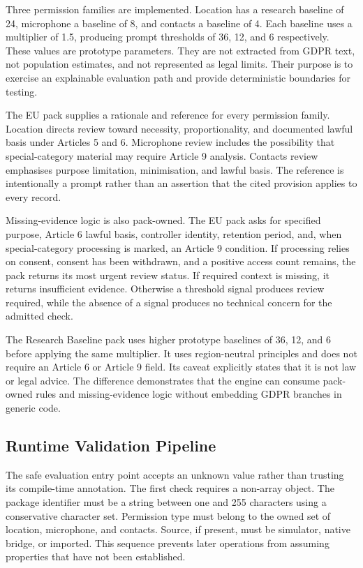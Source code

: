 Three permission families are implemented. Location has a research baseline of 24, microphone a baseline of 8, and contacts a baseline of 4. Each baseline uses a multiplier of 1.5, producing prompt thresholds of 36, 12, and 6 respectively. These values are prototype parameters. They are not extracted from GDPR text, not population estimates, and not represented as legal limits. Their purpose is to exercise an explainable evaluation path and provide deterministic boundaries for testing.

The EU pack supplies a rationale and reference for every permission family. Location directs review toward necessity, proportionality, and documented lawful basis under Articles 5 and 6. Microphone review includes the possibility that special-category material may require Article 9 analysis. Contacts review emphasises purpose limitation, minimisation, and lawful basis. The reference is intentionally a prompt rather than an assertion that the cited provision applies to every record.

Missing-evidence logic is also pack-owned. The EU pack asks for specified purpose, Article 6 lawful basis, controller identity, retention period, and, when special-category processing is marked, an Article 9 condition. If processing relies on consent, consent has been withdrawn, and a positive access count remains, the pack returns its most urgent review status. If required context is missing, it returns insufficient evidence. Otherwise a threshold signal produces review required, while the absence of a signal produces no technical concern for the admitted check.

The Research Baseline pack uses higher prototype baselines of 36, 12, and 6 before applying the same multiplier. It uses region-neutral principles and does not require an Article 6 or Article 9 field. Its caveat explicitly states that it is not law or legal advice. The difference demonstrates that the engine can consume pack-owned rules and missing-evidence logic without embedding GDPR branches in generic code.

\subsection{Runtime Validation Pipeline}

The safe evaluation entry point accepts an unknown value rather than trusting its compile-time annotation. The first check requires a non-array object. The package identifier must be a string between one and 255 characters using a conservative character set. Permission type must belong to the owned set of location, microphone, and contacts. Source, if present, must be simulator, native bridge, or imported. This sequence prevents later operations from assuming properties that have not been established.

